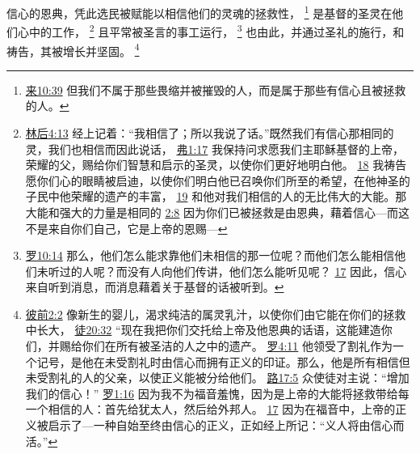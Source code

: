 \documentclass[12pt, a4paper, oneside]{ctexart}
\newcounter{parnum}[section]
\newcommand{\N}{%
   \noindent\refstepcounter{parnum}%
    \makebox[\parindent][l]{\textbf{\arabic{parnum}.}}}
\begin{document}
\N 信心的恩典，凭此选民被赋能以相信他们的灵魂的拯救性，
	\footnote {
		\href{https://biblehub.com/hebrews/10-39.htm}{来10:39} 但我们不属于那些畏缩并被摧毁的人，而是属于那些有信心且被拯救的人。
	}
	是基督的圣灵在他们心中的工作，
	\footnote {
		\href{https://biblehub.com/2_corinthians/4-13.htm}{林后4:13} 经上记着：“我相信了；所以我说了话。”既然我们有信心那相同的灵，我们也相信而因此说话，
		\href{https://biblehub.com/ephesians/1-17.htm}{弗1:17} 我保持问求愿我们主耶稣基督的上帝，荣耀的父，赐给你们智慧和启示的圣灵，以使你们更好地明白他。
		\href{https://biblehub.com/ephesians/1-18.htm}{18} 我祷告愿你们心的眼睛被启迪，以使你们明白他已召唤你们所至的希望，在他神圣的子民中他荣耀的遗产的丰富，
		\href{https://biblehub.com/ephesians/1-19.htm}{19} 和他对我们相信的人的无比伟大的大能。那大能和强大的力量是相同的
		\href{https://biblehub.com/ephesians/2-8.htm}{2:8} 因为你们已被拯救是由恩典，藉着信心---而这不是来自你们自己，它是上帝的恩赐---
	}
	且平常被圣言的事工运行，
	\footnote {
		\href{https://biblehub.com/romans/10-14.htm}{罗10:14} 那么，他们怎么能求靠他们未相信的那一位呢？而他们怎么能相信他们未听过的人呢？而没有人向他们传讲，他们怎么能听见呢？
		\href{https://biblehub.com/romans/10-17.htm}{17} 因此，信心来自听到消息，而消息藉着关于基督的话被听到。
	}
	也由此，并通过圣礼的施行，和祷告，其被增长并坚固。
	\footnote {
		\href{https://biblehub.com/1_peter/2-2.htm}{彼前2:2} 像新生的婴儿，渴求纯洁的属灵乳汁，以使你们由它能在你们的拯救中长大，
		\href{https://biblehub.com/acts/20-32.htm}{徒20:32} “现在我把你们交托给上帝及他恩典的话语，这能建造你们，并赐给你们在所有被圣洁的人之中的遗产。
		\href{https://biblehub.com/romans/4-11.htm}{罗4:11} 他领受了割礼作为一个记号，是他在未受割礼时由信心而拥有正义的印证。那么，他是所有相信但未受割礼的人的父亲，以使正义能被分给他们。
		\href{https://biblehub.com/luke/17-5.htm}{路17:5} 众使徒对主说：“增加我们的信心！”
		\href{https://biblehub.com/romans/1-16.htm}{罗1:16} 因为我不为福音羞愧，因为是上帝的大能将拯救带给每一个相信的人：首先给犹太人，然后给外邦人。
		\href{https://biblehub.com/romans/1-17.htm}{17} 因为在福音中，上帝的正义被启示了---一种自始至终由信心的正义，正如经上所记：“义人将由信心而活。”
	}
\end{document}
